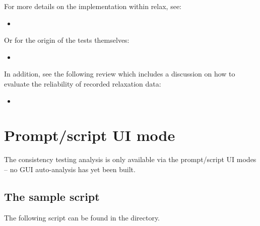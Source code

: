 For more details on the implementation within relax, see:

\begin{itemize}
\item {}
\end{itemize}

Or for the origin of the tests themselves:

\begin{itemize}
\item {}
\end{itemize}

In addition, see the following review which includes a discussion on how to evaluate the reliability of recorded relaxation data:

\begin{itemize}
\item {}
\end{itemize}


\section{Prompt/script UI mode}

The consistency testing analysis is only available via the prompt/script UI modes -- no GUI auto-analysis has yet been built.



\subsection{The sample script}

The following script can be found in the  directory.

